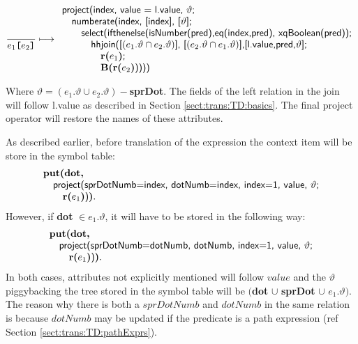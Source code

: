 \begin{equation}
\frac{}{e_1\mbox{\texttt{[}}e_2\mbox{\texttt{]}}}\longmapsto
\begin{array}{l}
\mbox{\textsf{project(index, value = l.value, }}\vartheta\mbox{\textsf{;}} \\ \quad
\mbox{\textsf{numberate(index, [index], [}}\vartheta\mbox{\textsf{];}} \\ \quad\quad
\mbox{\textsf{select(ifthenelse(isNumber(pred),}}
\mbox{\textsf{eq(index,pred), xqBoolean(pred));}} \\\quad\quad\quad
\mbox{\textsf{hhjoin([}}(e_1.\vartheta\cap e_2.\vartheta)\mbox{\textsf{], [}}(e_2.\vartheta\cap e_1.\vartheta)\mbox{\textsf{],}} 
\mbox{\textsf{[l.value,pred,}}\vartheta\mbox{\textsf{];}}
\\\quad\quad\quad\quad
 \mbox{\textbf{r(}}e_1\mbox{\textbf{)}\textsf{;}} \\\quad\quad\quad\quad
\mbox{\textbf{B(r(}}e_2\mbox{\textbf{)}\textsf{))))}} \\
\end{array}
\label{rule:trans:TD:predicate}
\end{equation}

Where $\vartheta=(e_1.\vartheta \cup e_2.\vartheta)-$\textbf{sprDot}. The fields of the left relation in the join
will follow \textsf{l.value} as described in Section \ref{sect:trans:TD:basics}. The final \textsf{project}
operator will restore the names of these attributes.

As described earlier, before translation of the expression the context item will be store in the symbol table:
\begin{equation*}
\begin{array}{l}
\mbox{\textbf{put(dot,}} \\ \quad
\mbox{\textsf{project(sprDotNumb=index, dotNumb=index, index=1, value, }}\vartheta\mbox{\textsf{;}} \\ \quad\quad
\mbox{\textbf{r(}}e_1\mbox{\textbf{)}\textsf{)}\textbf{)}}.
\end{array} 
\end{equation*}
However, if \textbf{dot} $\in e_1.\vartheta$, it will have to be stored in the following way:
\begin{equation*}
\begin{array}{l}
\mbox{\textbf{put(dot,}} \\ \quad
\mbox{\textsf{project(sprDotNumb=dotNumb, dotNumb, index=1, value, }}\vartheta\mbox{\textsf{;}} \\ \quad\quad
\mbox{\textbf{r(}}e_1\mbox{\textbf{)}\textsf{)}\textbf{)}}.
\end{array} 
\end{equation*}
In both cases, attributes not explicitly mentioned will follow $value$ and the $\vartheta$ piggybacking the tree
stored in the symbol table will be $($\textbf{dot} $\cup$ \textbf{sprDot} $\cup$ $e_1.\vartheta)$. The reason why
there is both a $sprDotNumb$ and $dotNumb$ in the same relation is because $dotNumb$ may be updated if the predicate is
a path expression (ref Section \ref{sect:trans:TD:pathExprs}).


